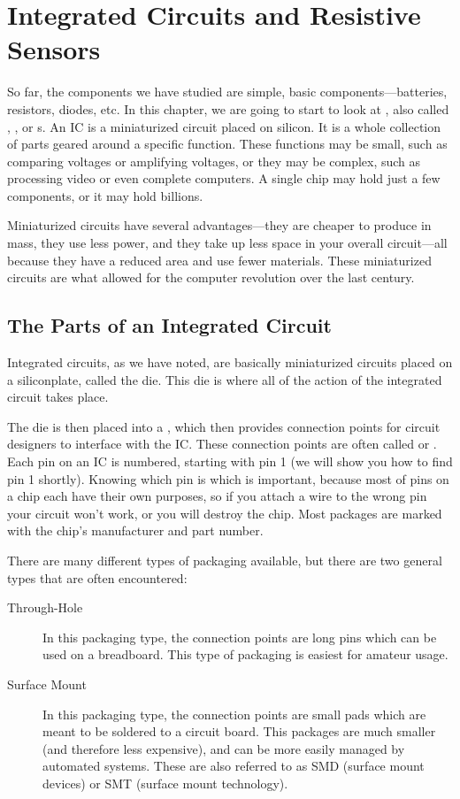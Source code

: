 \chapter{Integrated Circuits and Resistive Sensors}
\label{chapIC}

So far, the components we have studied are simple, basic components---batteries, resistors, diodes, etc.
In this chapter, we are going to start to look at , also called , , or s.
An IC is a miniaturized circuit placed on silicon.
It is a whole collection of parts geared around a specific function.
These functions may be small, such as comparing voltages or amplifying voltages, or they may be complex, such as processing video or even complete computers.
A single chip may hold just a few components, or it may hold billions.

Miniaturized circuits have several advantages---they are cheaper to produce in mass, they use less power, and they take up less space in your overall circuit---all because they have a reduced area and use fewer materials.
These miniaturized circuits are what allowed for the computer revolution over the last century.

\section{The Parts of an Integrated Circuit}

Integrated circuits, as we have noted, are basically miniaturized circuits placed on a siliconplate, called the die.
This die is where all of the action of the integrated circuit takes place.

The die is then placed into a , which then provides connection points for circuit designers to interface with the IC.
These connection points are often called  or .
Each pin on an IC is numbered, starting with pin 1 (we will show you how to find pin 1 shortly).
Knowing which pin is which is important, because most of pins on a chip each have their own purposes, so if you attach a wire to the wrong pin your circuit won't work, or you will destroy the chip.
Most packages are marked with the chip's manufacturer and part number.

There are many different types of packaging available, but there are two general types that are often encountered:

\begin{description}
\item[Through-Hole] In this packaging type, the connection points are long pins which can be used on a breadboard.  This type of packaging is easiest for amateur usage.
\item[Surface Mount]  In this packaging type, the connection points are small pads which are meant to be soldered to a circuit board.  This packages are much smaller (and therefore less expensive), and can be more easily managed by automated systems.  These are also referred to as SMD (surface mount devices) or SMT (surface mount technology).
\end{description}


